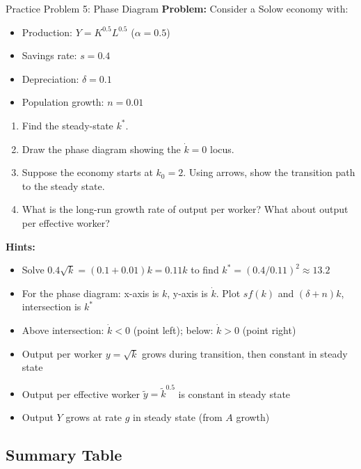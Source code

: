 \begin{frame}{Practice Problem 5: Phase Diagram}
\textbf{Problem:} Consider a Solow economy with:
\begin{itemize}
\item Production: $Y = K^{0.5} L^{0.5}$ ($\alpha = 0.5$)
\item Savings rate: $s = 0.4$
\item Depreciation: $\delta = 0.1$
\item Population growth: $n = 0.01$
\end{itemize}
\begin{enumerate}
\item Find the steady-state $k^*$.
\item Draw the phase diagram showing the $\dot{k}=0$ locus.
\item Suppose the economy starts at $k_0 = 2$. Using arrows, show the transition path to the steady state.
\item What is the long-run growth rate of output per worker? What about output per effective worker?
\end{enumerate}

\bigskip
\textbf{Hints:}
\begin{itemize}
\item Solve $0.4\sqrt{k} = (0.1 + 0.01)k = 0.11k$ to find $k^* = (0.4/0.11)^2 \approx 13.2$
\item For the phase diagram: x-axis is $k$, y-axis is $\dot{k}$. Plot $sf(k)$ and $(\delta+n)k$, intersection is $k^*$
\item Above intersection: $\dot{k} < 0$ (point left); below: $\dot{k} > 0$ (point right)
\item Output per worker $y = \sqrt{k}$ grows during transition, then constant in steady state
\item Output per effective worker $\tilde{y} = \tilde{k}^{0.5}$ is constant in steady state
\item Output $Y$ grows at rate $g$ in steady state (from $A$ growth)
\end{itemize}

\end{frame}

\subsection{Summary Table}

